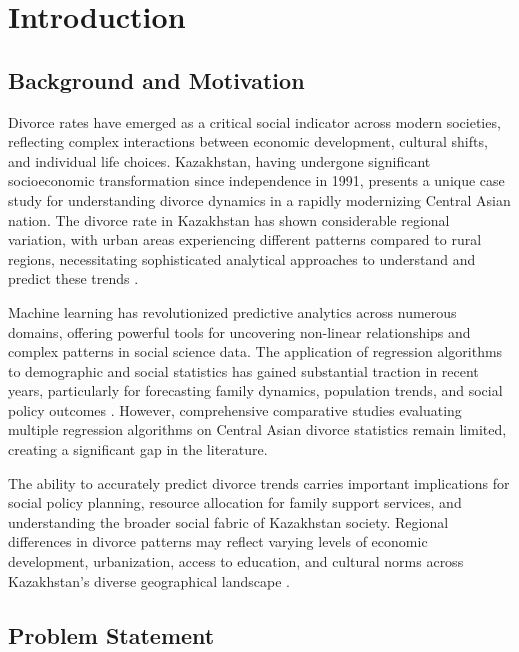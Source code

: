 %
%
\chapter{Introduction}
\label{chap:intro}
\setlength{\parskip}{1em}

\section{Background and Motivation}

Divorce rates have emerged as a critical social indicator across modern societies, reflecting complex interactions between economic development, cultural shifts, and individual life choices. Kazakhstan, having undergone significant socioeconomic transformation since independence in 1991, presents a unique case study for understanding divorce dynamics in a rapidly modernizing Central Asian nation. The divorce rate in Kazakhstan has shown considerable regional variation, with urban areas experiencing different patterns compared to rural regions, necessitating sophisticated analytical approaches to understand and predict these trends \cite{tillekova2020marriage}.

Machine learning has revolutionized predictive analytics across numerous domains, offering powerful tools for uncovering non-linear relationships and complex patterns in social science data. The application of regression algorithms to demographic and social statistics has gained substantial traction in recent years, particularly for forecasting family dynamics, population trends, and social policy outcomes \cite{abadie2020statistical}. However, comprehensive comparative studies evaluating multiple regression algorithms on Central Asian divorce statistics remain limited, creating a significant gap in the literature.

The ability to accurately predict divorce trends carries important implications for social policy planning, resource allocation for family support services, and understanding the broader social fabric of Kazakhstan society. Regional differences in divorce patterns may reflect varying levels of economic development, urbanization, access to education, and cultural norms across Kazakhstan's diverse geographical landscape \cite{agadjanian2021divorce}.

\section{Problem Statement}

